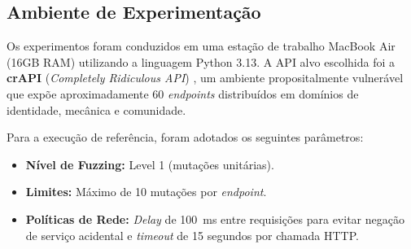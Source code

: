 \subsection{Ambiente de Experimentação}

Os experimentos foram conduzidos em uma estação de trabalho MacBook Air (16GB RAM) utilizando a linguagem Python 3.13. A API alvo escolhida foi a \textbf{crAPI} (\textit{Completely Ridiculous API}) \cite{crapi}, um ambiente propositalmente vulnerável que expõe aproximadamente 60 \textit{endpoints} distribuídos em domínios de identidade, mecânica e comunidade.

Para a execução de referência, foram adotados os seguintes parâmetros:

\begin{itemize}
    \item \textbf{Nível de Fuzzing:} Level 1 (mutações unitárias).
    \item \textbf{Limites:} Máximo de 10 mutações por \textit{endpoint}.
    \item \textbf{Políticas de Rede:} \textit{Delay} de 100~ms entre requisições para evitar negação de serviço acidental e \textit{timeout} de 15 segundos por chamada HTTP.
\end{itemize}